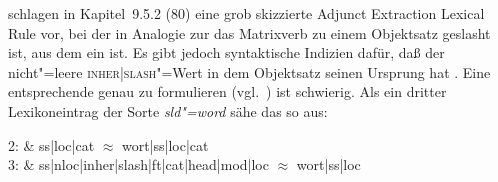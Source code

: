 \documentclass[output=paper]{LSP/langsci}
\begin{document}
\begin{exe}
{}
\end{exe}

\randnum\citet[387]{PollardSag1994} schlagen in Kapitel~9.5.2 (80) eine grob skizzierte Adjunct Extraction Lexical Rule vor, bei der in Analogie zur  das Matrixverb zu einem Objektsatz geslasht ist, aus dem ein   ist. Es gibt jedoch syntaktische Indizien dafür, daß der nicht"=leere \textsc{inher|slash}"=Wert in dem Objektsatz seinen Ursprung hat \citep{hukarietal1993a}. Eine entsprechende  genau zu formulieren (vgl.\ \citealt{hoehle1994a}) ist schwierig. Als ein dritter Lexikoneintrag der Sorte \textit{sld"=word} sähe das so aus:
\begin{exe}
\ex
\begin{avm}
\end{avm}

\hack{\vspace*{.5\baselineskip}}
\begin{avm}
\avml
{\@2}: & ss|loc|cat $\approx$ wort|ss|loc|cat \\
{\@3}: & ss|nloc|inher|slash|ft|cat|head|mod|loc $\approx$ wort|ss|loc
\avmr
\end{avm}
\end{exe}
\end{document}
